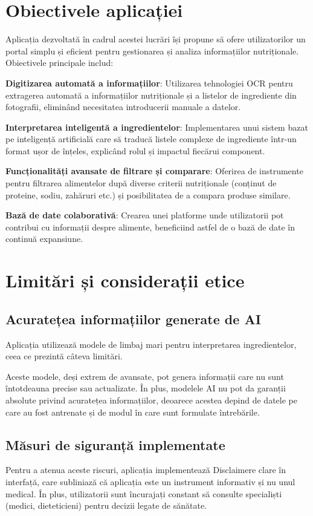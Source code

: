 \section{Obiectivele aplicației}

Aplicația dezvoltată în cadrul acestei lucrări își propune să ofere utilizatorilor un portal simplu și eficient pentru gestionarea și analiza informațiilor nutriționale. Obiectivele principale includ:

\textbf{Digitizarea automată a informațiilor}: Utilizarea tehnologiei OCR pentru extragerea automată a informațiilor nutriționale și a listelor de ingrediente din fotografii, eliminând necesitatea introducerii manuale a datelor.

\textbf{Interpretarea inteligentă a ingredientelor}: Implementarea unui sistem bazat pe inteligență artificială care să traducă listele complexe de ingrediente într-un format ușor de înțeles, explicând rolul și impactul fiecărui component.

\textbf{Funcționalități avansate de filtrare și comparare}: Oferirea de instrumente pentru filtrarea alimentelor după diverse criterii nutriționale (conținut de proteine, sodiu, zahăruri etc.) și posibilitatea de a compara produse similare.

\textbf{Bază de date colaborativă}: Crearea unei platforme unde utilizatorii pot contribui cu informații despre alimente, beneficiind astfel de o bază de date în continuă expansiune.

\section{Limitări și considerații etice}

\subsection{Acuratețea informațiilor generate de AI}

Aplicația utilizează modele de limbaj mari pentru interpretarea ingredientelor, ceea ce prezintă câteva limitări.

Aceste modele, deși extrem de avansate, pot genera informații care nu sunt întotdeauna precise sau actualizate. În plus, modelele AI nu pot da garanții absolute privind acuratețea informațiilor, deoarece acestea depind de datele pe care au fost antrenate și de modul în care sunt formulate întrebările.

\subsection{Măsuri de siguranță implementate}

Pentru a atenua aceste riscuri, aplicația implementează Disclaimere clare în interfață, care subliniază că aplicația este un instrument informativ și nu unul medical. În plus, utilizatorii sunt încurajați constant să consulte specialiști (medici, dieteticieni) pentru decizii legate de sănătate.

